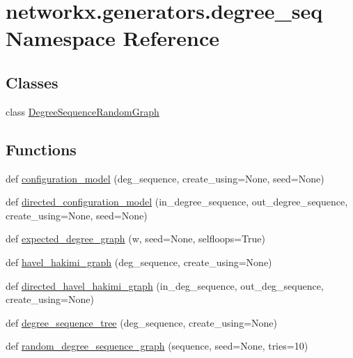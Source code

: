 \hypertarget{namespacenetworkx_1_1generators_1_1degree__seq}{}\section{networkx.\+generators.\+degree\+\_\+seq Namespace Reference}
\label{namespacenetworkx_1_1generators_1_1degree__seq}
\subsection*{Classes}
\begin{DoxyCompactItemize}
\item 
class \hyperlink{classnetworkx_1_1generators_1_1degree__seq_1_1DegreeSequenceRandomGraph}{Degree\+Sequence\+Random\+Graph}
\end{DoxyCompactItemize}
\subsection*{Functions}
\begin{DoxyCompactItemize}
\item 
def \hyperlink{namespacenetworkx_1_1generators_1_1degree__seq_a49e1c606f04d5437eafb94b6f71a80b1}{configuration\+\_\+model} (deg\+\_\+sequence, create\+\_\+using=None, seed=None)
\item 
def \hyperlink{namespacenetworkx_1_1generators_1_1degree__seq_abaa3b61d4b1f02e7ecbbd6edf407cb85}{directed\+\_\+configuration\+\_\+model} (in\+\_\+degree\+\_\+sequence, out\+\_\+degree\+\_\+sequence, create\+\_\+using=None, seed=None)
\item 
def \hyperlink{namespacenetworkx_1_1generators_1_1degree__seq_a3065c6aef50cefb696973b782ec9d10f}{expected\+\_\+degree\+\_\+graph} (w, seed=None, selfloops=True)
\item 
def \hyperlink{namespacenetworkx_1_1generators_1_1degree__seq_a210368f4322a6114b939560da3849c14}{havel\+\_\+hakimi\+\_\+graph} (deg\+\_\+sequence, create\+\_\+using=None)
\item 
def \hyperlink{namespacenetworkx_1_1generators_1_1degree__seq_a894fdb352d8c1e8aae86009fc66a6443}{directed\+\_\+havel\+\_\+hakimi\+\_\+graph} (in\+\_\+deg\+\_\+sequence, out\+\_\+deg\+\_\+sequence, create\+\_\+using=None)
\item 
def \hyperlink{namespacenetworkx_1_1generators_1_1degree__seq_abdef4fbd6e4bed141b552c11d54cfba8}{degree\+\_\+sequence\+\_\+tree} (deg\+\_\+sequence, create\+\_\+using=None)
\item 
def \hyperlink{namespacenetworkx_1_1generators_1_1degree__seq_a550339320fb130deb73bf8e594485d7e}{random\+\_\+degree\+\_\+sequence\+\_\+graph} (sequence, seed=None, tries=10)
\end{DoxyCompactItemize}
